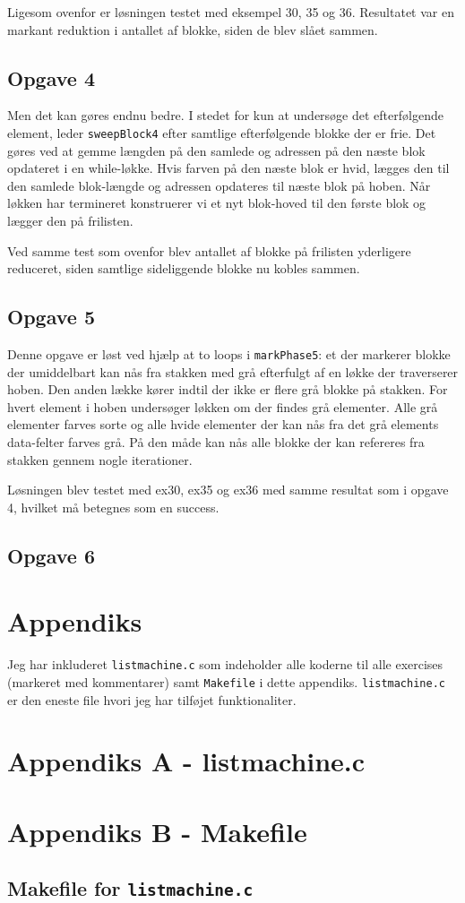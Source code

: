\documentclass{article}
\begin{document}
Ligesom ovenfor er løsningen testet med eksempel 30, 35 og 36. Resultatet var en markant reduktion i antallet af blokke, siden de blev slået sammen.

\subsection*{Opgave 4}
Men det kan gøres endnu bedre. I stedet for kun at undersøge det efterfølgende element, leder \texttt{sweepBlock4} efter samtlige efterfølgende blokke der er frie. Det gøres ved at gemme længden på den samlede og adressen på den næste blok opdateret i en while-løkke. Hvis farven på den næste blok er hvid, lægges den til den samlede blok-længde og adressen opdateres til næste blok på hoben. Når løkken har termineret konstruerer vi et nyt blok-hoved til den første blok og lægger den på frilisten.

Ved samme test som ovenfor blev antallet af blokke på frilisten yderligere reduceret, siden samtlige sideliggende blokke nu kobles sammen.

\subsection*{Opgave 5}
Denne opgave er løst ved hjælp at to loops i \texttt{markPhase5}: et der markerer blokke der umiddelbart kan nås fra stakken med grå efterfulgt af en løkke der traverserer hoben. Den anden lække kører indtil der ikke er flere grå blokke på stakken. For hvert element i hoben undersøger løkken om der findes grå elementer. Alle grå elementer farves sorte og alle hvide elementer der kan nås fra det grå elements data-felter farves grå. På den måde kan nås alle blokke der kan refereres fra stakken gennem nogle iterationer.

Løsningen blev testet med ex30, ex35 og ex36 med samme resultat som i opgave 4, hvilket må betegnes som en success.

\subsection*{Opgave 6}


\newpage

\section*{Appendiks}
Jeg har inkluderet \texttt{listmachine.c} som indeholder alle koderne til alle exercises (markeret med kommentarer) samt \texttt{Makefile} i dette appendiks. \texttt{listmachine.c} er den eneste file hvori jeg har tilføjet funktionaliter.

\label{listmachine}
\section*{Appendiks A - listmachine.c}


\newpage 

\section*{Appendiks B - Makefile}
\subsection*{Makefile for \texttt{listmachine.c}}


\label{lastPage}
\end{document}
